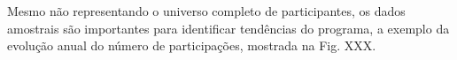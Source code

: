\documentclass[
12pt,		%
openright,	%
twoside,  %
a4paper,			%
chapter=TITLE,		%
english,			%
french,				%
spanish,			%
brazil				%
]{USPSC-classe/USPSC}
\begin{document}
Mesmo n\~ao representando o universo completo de participantes, os dados amostrais s\~ao importantes para identificar tend\^encias do programa, a exemplo da evolu\c{c}\~ao anual do n\'umero de participa\c{c}\~oes, mostrada na Fig. XXX.



















\captionsetup{format=plain}
\begin{figure}[max size={\textwidth}{\textheight}]

\centering



\end{figure}
\end{document}
